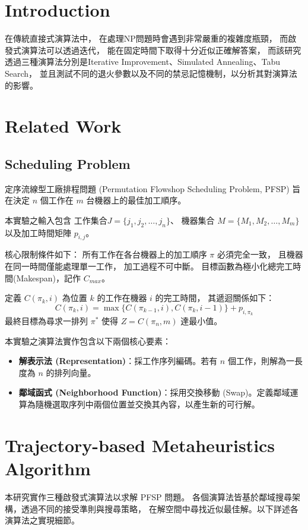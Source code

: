 \documentclass[conference]{IEEEtran}
\begin{document}
\section{Introduction}
在傳統直接式演算法中，
在處理NP問題時會遇到非常嚴重的複雜度瓶頸，
而啟發式演算法可以透過迭代，
能在固定時間下取得十分近似正確解答案，
而該研究透過三種演算法分別是Iterative Improvement、Simulated Annealing、Tabu Search，
並且測試不同的退火參數以及不同的禁忌記憶機制，以分析其對演算法的影響。




\section{Related Work}
\subsection{Scheduling Problem}
定序流線型工廠排程問題 (Permutation Flowshop Scheduling Problem, PFSP)
旨在決定 $n$ 個工作在 $m$ 台機器上的最佳加工順序。

本實驗之輸入包含
工作集合$J = \{j_1, j_2, \dots, j_n\}$、
機器集合 $M = \{M_1, M_2, \dots, M_m\}$
以及加工時間矩陣 $p_{i,j}$。

核心限制條件如下：
所有工作在各台機器上的加工順序 $\pi$ 必須完全一致，
且機器在同一時間僅能處理單一工作，
加工過程不可中斷。
目標函數為極小化總完工時間(Makespan)，記作 $C_{max}$。

定義 $C(\pi_k, i)$ 為位置 $k$ 的工作在機器 $i$ 的完工時間，
其遞迴關係如下：
\begin{equation}
    C(\pi_k, i) = \max\{C(\pi_{k-1}, i), C(\pi_k, i-1)\} + p_{i,\pi_k}
\end{equation}
最終目標為尋求一排列 $\pi^*$ 使得 $Z = C(\pi_n, m)$ 達最小值。

本實驗之演算法實作包含以下兩個核心要素：
\begin{itemize}
    \setlength{\itemsep}{0pt}
    \item \textbf{解表示法 (Representation)}：採工作序列編碼。若有 $n$ 個工作，則解為一長度為 $n$ 的排列向量。
    \item \textbf{鄰域函式 (Neighborhood Function)}：採用交換移動 (Swap)。定義鄰域運算為隨機選取序列中兩個位置並交換其內容，以產生新的可行解。
\end{itemize}

\section{Trajectory-based Metaheuristics Algorithm}
本研究實作三種啟發式演算法以求解 PFSP 問題。
各個演算法皆基於鄰域搜尋架構，透過不同的接受準則與搜尋策略，
在解空間中尋找近似最佳解。以下詳述各演算法之實現細節。
\end{document}
